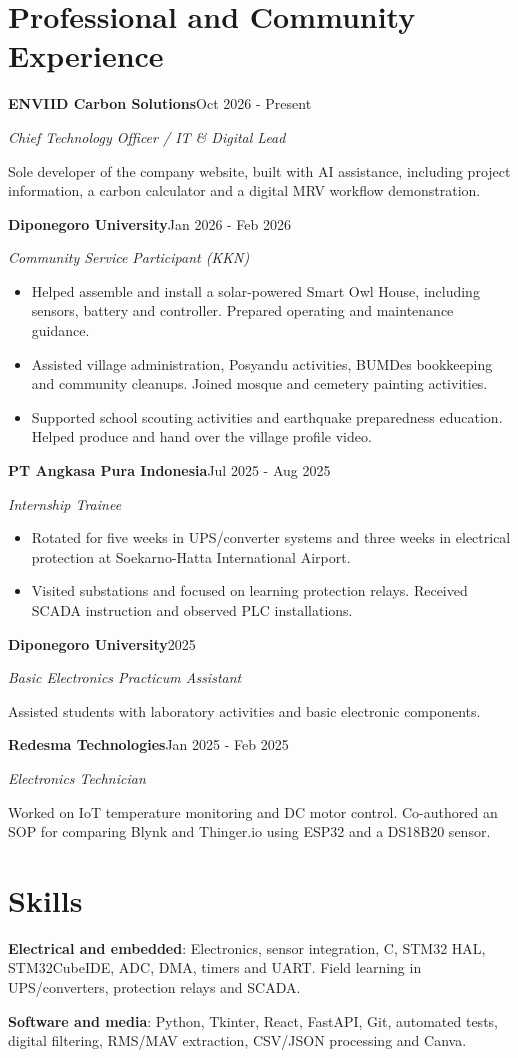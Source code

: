 \documentclass[11pt,a4paper]{article}
\newcommand{\cventry}[6]{%
  \Needspace{4\baselineskip}%
  \textbf{#3}\hfill #1\par
  \textit{#2}\ifstrempty{#4}{}{\hfill #4}\par
  #6\par\vspace{4pt}}
\newcommand{\cvitem}[2]{\textbf{#1}: #2\par}
\begin{document}
\section{Professional and Community Experience}
\cventry{Oct 2026 - Present}{Chief Technology Officer / IT \& Digital Lead}{ENVIID Carbon Solutions}{}{}{
Sole developer of the company website, built with AI assistance, including project information,
a carbon calculator and a digital MRV workflow demonstration.}
\cventry{Jan 2026 - Feb 2026}{Community Service Participant (KKN)}{Diponegoro University}{Mutihan, Klaten}{}{
\begin{itemize}
\item Helped assemble and install a solar-powered Smart Owl House, including sensors, battery and controller. Prepared operating and maintenance guidance.
\item Assisted village administration, Posyandu activities, BUMDes bookkeeping and community cleanups. Joined mosque and cemetery painting activities.
\item Supported school scouting activities and earthquake preparedness education. Helped produce and hand over the village profile video.
\end{itemize}}
\cventry{Jul 2025 - Aug 2025}{Internship Trainee}{PT Angkasa Pura Indonesia}{}{}{
\begin{itemize}
\item Rotated for five weeks in UPS/converter systems and three weeks in electrical protection at Soekarno-Hatta International Airport.
\item Visited substations and focused on learning protection relays. Received SCADA instruction and observed PLC installations.
\end{itemize}}
\cventry{2025}{Basic Electronics Practicum Assistant}{Diponegoro University}{}{}{
Assisted students with laboratory activities and basic electronic components.}
\cventry{Jan 2025 - Feb 2025}{Electronics Technician}{Redesma Technologies}{}{}{
Worked on IoT temperature monitoring and DC motor control. Co-authored an SOP
for comparing Blynk and Thinger.io using ESP32 and a DS18B20 sensor.}

\section{Skills}
\cvitem{Electrical and embedded}{Electronics, sensor integration, C, STM32 HAL,
STM32CubeIDE, ADC, DMA, timers and UART. Field learning in UPS/converters, protection relays and SCADA.}
\cvitem{Software and media}{Python, Tkinter, React, FastAPI, Git, automated tests,
digital filtering, RMS/MAV extraction, CSV/JSON processing and Canva.}
\end{document}
